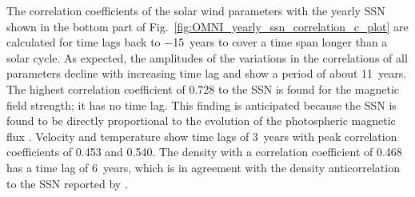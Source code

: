 \documentclass[]{aa}
\begin{document}
        The correlation coefficients of the solar wind parameters with the yearly SSN shown in the bottom part of Fig.~\ref{fig:OMNI_yearly_ssn_correlation_c_plot} are calculated for time lags back to \num{-15}~years to cover a time span longer than a solar cycle. As expected, the amplitudes of the variations in the correlations of all parameters decline with increasing time lag and show a period of about 11~years. The highest correlation coefficient of 0.728 to the SSN is found for the magnetic field strength; it has no time lag. This finding is anticipated because the SSN is found to be directly proportional to the evolution of the photospheric magnetic flux \citep{Smith2003}.
        Velocity and temperature show time lags of 3~years with peak correlation coefficients of 0.453 and 0.540. The density with a correlation coefficient of 0.468 has a time lag of 6~years, which is in agreement with the density anticorrelation to the SSN reported by \citet{Bougeret1984}.
\end{document}
